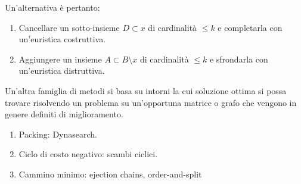 \documentclass[\main/main.tex]{subfiles}
\begin{document}
\begin{multicols}{2}
\begin{definition}
    Un'alternativa è pertanto:
    \begin{enumerate}
        \item Cancellare un sotto-insieme \(D \subset x\) di cardinalità \(\leq k\) e completarla con un'euristica costruttiva.
        \item Aggiungere un insieme \(A \subset B \setminus x\) di cardinalità \(\leq k\) e sfrondarla con un'euristica distruttiva.
    \end{enumerate}    
\end{definition}
\begin{observation}
    Un'altra famiglia di metodi si basa su intorni la cui soluzione ottima si possa trovare risolvendo un problema su un'opportuna matrice o grafo che vengono in genere definiti di miglioramento.
    \begin{enumerate}
        \item Packing: Dynasearch.
        \item Ciclo di costo negativo: scambi ciclici.
        \item Cammino minimo: ejection chains, order-and-split
    \end{enumerate}
\end{observation}
\end{multicols}
\end{document}

